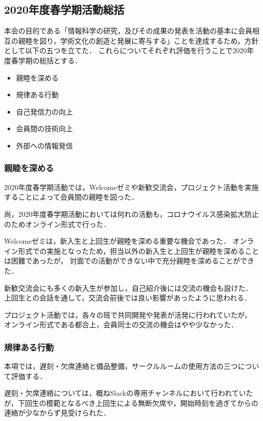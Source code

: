 \subsection*{2020年度春学期活動総括}


本会の目的である「情報科学の研究，及びその成果の発表を活動の基本に会員相互の親睦を図り，学術文化の創造と発展に寄与する」ことを達成するため，方針として以下の五つを立てた．
これらについてそれぞれ評価を行うことで2020年度春学期の総括とする．

\begin{itemize}
    \item 親睦を深める
    \item 規律ある行動
    \item 自己発信力の向上
    \item 会員間の技術向上
    \item 外部への情報発信
\end{itemize}

\subsubsection*{親睦を深める}
    2020年度春学期活動では，Welcomeゼミや新歓交流会，プロジェクト活動を実施することによって会員間の親睦を図った．

    尚，2020年度春学期活動においては何れの活動も，コロナウイルス感染拡大防止のためオンライン形式で行った．

    Welcomeゼミは，新入生と上回生が親睦を深める重要な機会であった．
    オンライン形式での実施となったため，担当以外の新入生と上回生が親睦を深めることは困難であったが，
    対面での活動ができない中で充分親睦を深めることができた．

    新歓交流会にも多くの新入生が参加し，自己紹介後には交流の機会も設けた．
    上回生との会話を通して，交流会前後では良い影響があったように思われる．

    プロジェクト活動では，各々の班で共同開発や発表が活発に行われていたが，
    オンライン形式である都合上，会員同士の交流の機会はやや少なかった．

\subsubsection*{規律ある行動}
    本項では，遅刻・欠席連絡と備品整備，サークルルームの使用方法の三つについて評価する．

    遅刻・欠席連絡については，概ねSlackの専用チャンネルにおいて行われていたが，下回生の模範となるべき上回生による無断欠席や，開始時刻を過ぎてからの連絡が少なからず見受けられた．


